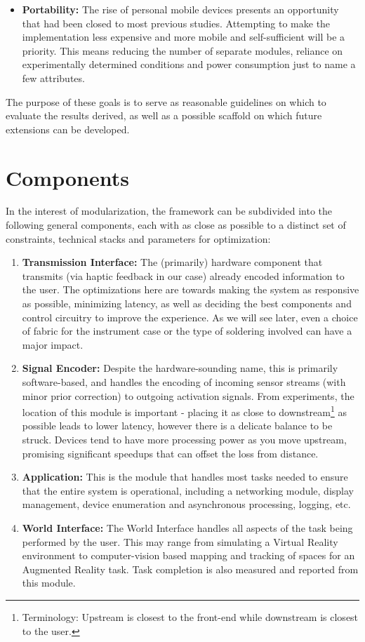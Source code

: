 \documentclass[
12pt, %
oneside, %
english, %
doublespacing, %
headsepline, %
]{MastersDoctoralThesis} %
\begin{document}
\begin{itemize}
\item \textbf{Portability:} The rise of personal mobile devices presents an opportunity that had been closed to most previous studies. Attempting to make the implementation less expensive and more mobile and self-sufficient will be a priority. This means reducing the number of separate modules, reliance on experimentally determined conditions and power consumption just to name a few attributes.
\end{itemize}

The purpose of these goals is to serve as reasonable guidelines on which to evaluate the results derived, as well as a possible scaffold on which future extensions can be developed.

\section{Components}
\label{Components}

In the interest of modularization, the framework can be subdivided into the following general components, each with as close as possible to a distinct set of constraints, technical stacks and parameters for optimization:

\begin{enumerate}
\item \textbf{Transmission Interface:} The (primarily) hardware component that transmits (via haptic feedback in our case) already encoded information to the user. The optimizations here are towards making the system as responsive as possible, minimizing latency, as well as deciding the best components and control circuitry to improve the experience. As we will see later, even a choice of fabric for the instrument case or the type of soldering involved can have a major impact.
\item \textbf{Signal Encoder:} Despite the hardware-sounding name, this is primarily software-based, and handles the encoding of incoming sensor streams (with minor prior correction) to outgoing activation signals. From experiments, the location of this module is important - placing it as close to downstream\footnote{Terminology: Upstream is closest to the front-end while downstream is closest to the user.} as possible leads to lower latency, however there is a delicate balance to be struck. Devices tend to have more processing power as you move upstream, promising significant speedups that can offset the loss from distance.
\item \textbf{Application:} This is the module that handles most tasks needed to ensure that the entire system is operational, including a networking module, display management, device enumeration and asynchronous processing, logging, etc.
\item \textbf{World Interface:} The World Interface handles all aspects of the task being performed by the user. This may range from simulating a Virtual Reality environment to computer-vision based mapping and tracking of spaces for an Augmented Reality task. Task completion is also measured and reported from this module.
\end{enumerate}
\end{document}
